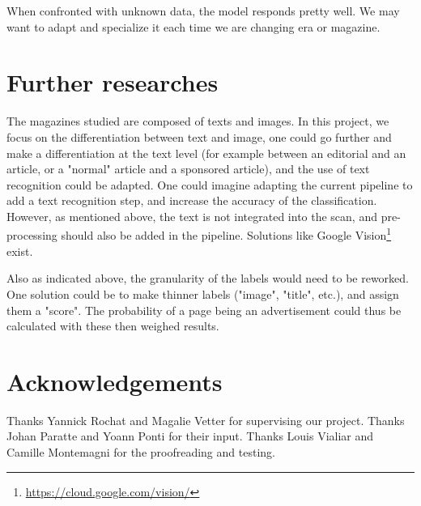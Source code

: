 \documentclass[10pt,conference,compsocconf]{IEEEtran}
\begin{document}
When confronted with unknown data, the model responds pretty well. We may want to adapt and specialize it each time we are changing era or magazine.

\section{Further researches}
The magazines studied are composed of texts and images. In this project, we focus on the differentiation between text and image, one could go further and make a differentiation at the text level (for example between an editorial and an article, or a "normal" article and a sponsored article), and the use of text recognition could be adapted. One could imagine adapting the current pipeline to add a text recognition step, and increase the accuracy of the classification. However, as mentioned above, the text is not integrated into the scan, and pre-processing should also be added in the pipeline. Solutions like Google Vision\footnote{\url{https://cloud.google.com/vision/}} exist.

Also as indicated above, the granularity of the labels would need to be reworked. One solution could be to make thinner labels ("image", "title", etc.), and assign them a "score". The probability of a page being an advertisement could thus be calculated with these then weighed results.

\section*{Acknowledgements}
Thanks Yannick Rochat and Magalie Vetter for supervising our project. Thanks Johan Paratte and Yoann Ponti for their input. Thanks Louis Vialiar and Camille Montemagni for the proofreading and testing.


\nocite{*} %

\end{document}
